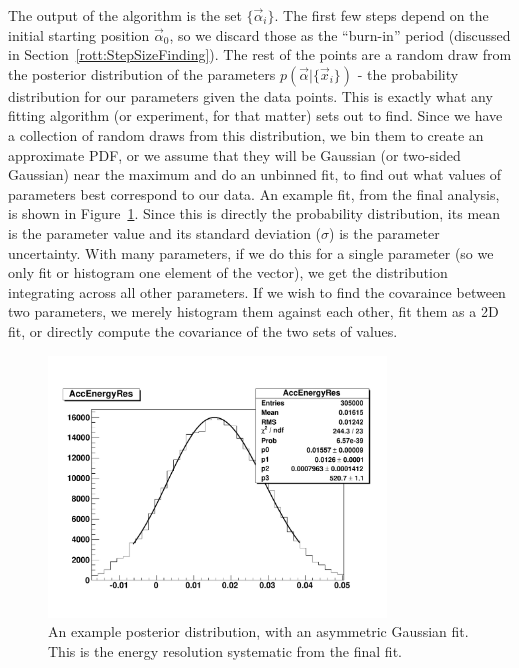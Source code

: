 The output of the algorithm is the set $\{\vec{\alpha}_i\}$.  The
first few steps depend on the initial starting position
$\vec{\alpha}_0$, so we discard those as the ``burn-in'' period
(discussed in \mbox{Section \ref{rott:StepSizeFinding}}).  The rest of
the points are a random draw from the posterior distribution of the
parameters $p(\vec{\alpha}|\{\vec{x}_i\})$ - the probability
distribution for our parameters given the data points.  This is
exactly what any fitting algorithm (or experiment, for that matter)
sets out to find.  Since we have a collection of random draws from
this distribution, we bin them to create an approximate PDF, or we
assume that they will be Gaussian (or two-sided Gaussian) near the
maximum and do an unbinned fit, to find out what values of parameters
best correspond to our data.  An example fit, from the final analysis,
is shown in \mbox{Figure \ref{FinalPostDist}}.  Since this is directly
the probability distribution, its mean is the parameter value and its
standard deviation ($\sigma$) is the parameter uncertainty.  With many
parameters, if we do this for a single parameter (so we only fit or
histogram one element of the vector), we get the distribution
integrating across all other parameters.  If we wish to find the
covaraince between two parameters, we merely histogram them against
each other, fit them as a 2D fit, or directly compute the covariance
of the two sets of values.

\begin{figure}
\centering
\includegraphics[width=0.8\textwidth]{Figures/MCMC/EnergyResPost}
\caption[Example posterior distribution]{An example posterior
distribution, with an asymmetric Gaussian fit.  This is the energy
resolution systematic from the final fit.
\label{FinalPostDist}}
\end{figure}


